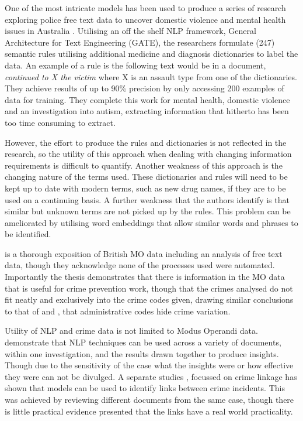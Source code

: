 One of the most intricate models has been used to produce a series of research exploring police free text data to uncover domestic violence and mental health issues in Australia  \parencite{karystianis2018automatic, karystianis2019automated, Hwang2020}. Utilising an off the shelf NLP framework, General Architecture for Text Engineering (GATE), the researchers formulate (247) semantic rules utilising additional medicine and diagnosis dictionaries  to label the data. An example of a rule is the following text would be in a document,  \emph{continued to X the victim} where X is an assault type from one of the dictionaries. They achieve results of up to 90\% precision by only accessing 200 examples of data for training. They complete this work for mental health, domestic violence and an investigation into autism, extracting information that hitherto has been too time consuming to extract. 

However, the effort to produce the rules and dictionaries is not reflected in the research, so the utility of this approach when dealing with changing information requirements is difficult to quantify. Another weakness of this approach is the changing nature of the terms used. These dictionaries and rules will need to be kept up to date with modern terms, such as new drug names, if they are to be used on a continuing basis. A further weakness that the authors identify is that similar but unknown terms are not picked up by the rules. This problem can be ameliorated by utilising word embeddings that allow similar words and phrases to be identified.

\textcite{rogerson2016utility} is a thorough exposition of British MO data including an analysis of free text data, though they acknowledge none of the processes used were automated. Importantly the thesis demonstrates that there is information in the MO data that is useful for crime prevention work, though that the crimes analysed do not fit neatly and exclusively into the crime codes given, drawing similar conclusions to that of \textcite{birks2020unsupervised} and \textcite{kuang2017crime}, that administrative codes hide crime variation. 

 
Utility of NLP and crime data is not limited to Modus Operandi data. \textcite{Helbich2013326} demonstrate that NLP techniques can be used across a variety of documents, within one investigation, and the results drawn together to produce  insights. Though due to the sensitivity of the case what the insights were or how effective they were can not be divulged. A separate studies  \parencite{cocx2006distance}, focussed on crime linkage has shown that models can be used to identify links between crime incidents. This was achieved by reviewing different documents from the same case, though there is little practical evidence presented that the links have a real world practicality. 

